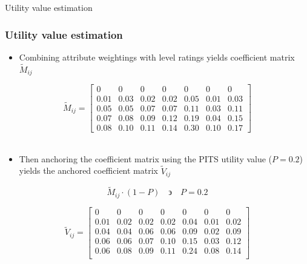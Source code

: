 \documentclass[t,compress,9pt,aspectratio=169]{beamer}
\begin{document}
\begin{frame}{Utility value estimation}
    \frametitle{Utility value estimation}
    \begin{itemize}
        \item Combining attribute weightings with level ratings yields coefficient matrix \(\tilde{M}_{ij}\) 
    \end{itemize}
\begin{equation}\label{coeff_matrix}
\tilde{M}_{ij} =  
\begin{bmatrix}
0 & 0 & 0 & 0 & 0 & 0 & 0 \\
0.01 & 0.03 & 0.02 & 0.02 & 0.05 & 0.01 & 0.03 \\
0.05 & 0.05 & 0.07 & 0.07 & 0.11 & 0.03 & 0.11 \\
0.07 & 0.08 & 0.09 & 0.12 & 0.19 & 0.04 & 0.15 \\
0.08 & 0.10 & 0.11 & 0.14 & 0.30 & 0.10 & 0.17
\end{bmatrix}
\end{equation}
\\
    \begin{itemize}
        \item Then anchoring the coefficient matrix using the PITS utility value (\(P = 0.2\)) yields the anchored coefficient matrix \(\tilde{V}_{ij}\) 
    \end{itemize}
\begin{equation}\label{eq:anchoring}
    \tilde{M}_{ij} \cdot (1-P) \quad \backepsilon \quad P = 0.2 
\end{equation}

\begin{equation}\label{ma:anchored_matrix}
\tilde{V}_{ij} =  
\begin{bmatrix}
0 & 0 & 0 & 0 & 0 & 0 & 0 \\
0.01 & 0.02 & 0.02 & 0.02 & 0.04 & 0.01 & 0.02 \\
0.04 & 0.04 & 0.06 & 0.06 & 0.09 & 0.02 & 0.09 \\
0.06 & 0.06 & 0.07 & 0.10 & 0.15 & 0.03 & 0.12 \\
0.06 & 0.08 & 0.09 & 0.11 & 0.24 & 0.08 & 0.14 \\
\end{bmatrix}
\end{equation}
\\

\end{frame}
\end{document}

